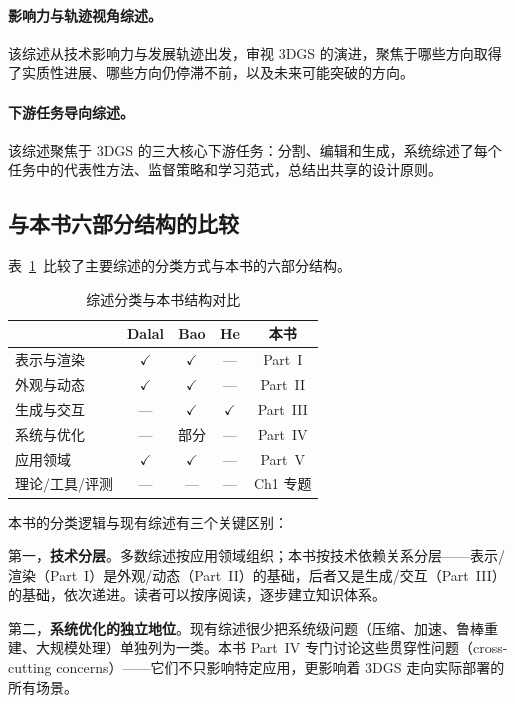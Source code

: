\paragraph{影响力与轨迹视角综述。} 该综述从技术影响力与发展轨迹出发，审视 3DGS 的演进，聚焦于哪些方向取得了实质性进展、哪些方向仍停滞不前，以及未来可能突破的方向。

\paragraph{下游任务导向综述。} 该综述聚焦于 3DGS 的三大核心下游任务：分割、编辑和生成，系统综述了每个任务中的代表性方法、监督策略和学习范式，总结出共享的设计原则。

\subsection{与本书六部分结构的比较}

表~\ref{tab:survey_comparison}~比较了主要综述的分类方式与本书的六部分结构。

\begin{table}[htbp]
\centering
\caption{综述分类与本书结构对比}
\label{tab:survey_comparison}
\begin{tabular}{lcccc}
\toprule
& \textbf{Dalal} & \textbf{Bao} & \textbf{He} & \textbf{本书} \\
\midrule
表示与渲染 & $\checkmark$ & $\checkmark$ & — & Part~I \\
外观与动态 & $\checkmark$ & $\checkmark$ & — & Part~II \\
生成与交互 & — & $\checkmark$ & $\checkmark$ & Part~III \\
系统与优化 & — & 部分 & — & Part~IV \\
应用领域 & $\checkmark$ & $\checkmark$ & — & Part~V \\
理论/工具/评测 & — & — & — & Ch1 专题 \\
\bottomrule
\end{tabular}
\end{table}

本书的分类逻辑与现有综述有三个关键区别：

第一，\textbf{技术分层}。多数综述按应用领域组织；本书按技术依赖关系分层——表示/渲染（Part~I）是外观/动态（Part~II）的基础，后者又是生成/交互（Part~III）的基础，依次递进。读者可以按序阅读，逐步建立知识体系。

第二，\textbf{系统优化的独立地位}。现有综述很少把系统级问题（压缩、加速、鲁棒重建、大规模处理）单独列为一类。本书 Part~IV 专门讨论这些贯穿性问题（cross-cutting concerns）——它们不只影响特定应用，更影响着 3DGS 走向实际部署的所有场景。

